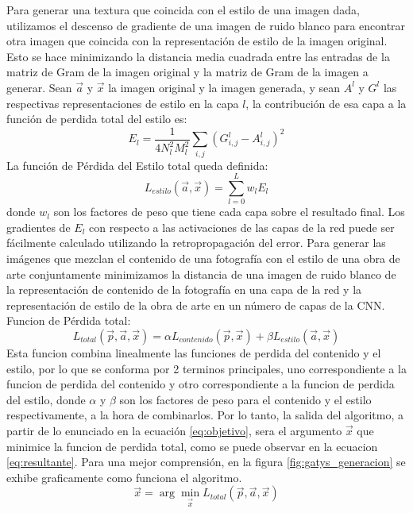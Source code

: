 \documentclass[a4paper,11pt,spanish]{book}
\begin{document}
      Para generar una textura que coincida con el estilo de una imagen dada, utilizamos el descenso de gradiente de una imagen de ruido blanco para encontrar otra imagen que coincida
      con la representación de estilo de la imagen original. Esto se hace minimizando la distancia media cuadrada entre las entradas de la matriz de Gram de la imagen
      original y la matriz de Gram de la imagen a generar. Sean $\overrightarrow{a}$ y $\overrightarrow{x}$ la imagen original y la imagen generada, y sean $A^l$ y $G^l$
      las respectivas representaciones de estilo en la capa $l$, la contribución de esa capa a la función de perdida total del estilo es:
      \begin{equation}
       E_l = \frac{1}{4 N_l^2 M_l^2} \sum_{i,j} (G_{i,j}^l - A_{i,j}^l)^2
      \end{equation}
      La función de Pérdida del Estilo total queda definida:
      \begin{equation}
       L_{estilo}(\overrightarrow{a},\overrightarrow{x}) = \sum_{l=0}^{L} w_l E_l
      \end{equation}
      donde $w_l$ son los factores de peso que tiene cada capa sobre el resultado final. Los gradientes de $E_l$ con respecto a las activaciones de las capas de la red puede ser fácilmente
      calculado utilizando la retropropagación del error.
      Para generar las imágenes que mezclan el contenido de una fotografía con el estilo de una obra de arte conjuntamente minimizamos la distancia de una imagen de ruido blanco
      de la representación de contenido de la fotografía en una capa de la red y la representación de estilo de la obra de arte en un número de capas de la CNN.
      Funcion de Pérdida total:
      \begin{equation}\label{eq:objetivo}
       L_{total}(\overrightarrow{p},\overrightarrow{a},\overrightarrow{x}) = \alpha L_{contenido}(\overrightarrow{p},\overrightarrow{x}) + \beta L_{estilo}(\overrightarrow{a},\overrightarrow{x})
      \end{equation}
      Esta funcion combina linealmente las funciones de perdida del contenido y el estilo, por lo que se conforma por 2 terminos principales, uno correspondiente a la funcion de perdida
      del contenido y otro correspondiente a la funcion de perdida del estilo, donde $\alpha$ y $\beta$ son los factores de peso para el contenido y el estilo respectivamente, 
      a la hora de combinarlos. Por lo tanto, la salida del algoritmo, a partir de lo enunciado en la ecuación \eqref{eq:objetivo}, sera el argumento $\overrightarrow{x}$
      que minimice la funcion de perdida total, como se puede observar en la ecuacion \eqref{eq:resultante}. Para una mejor comprensión, en la figura \ref{fig:gatys_generacion} 
      se exhibe graficamente como funciona el algoritmo.
      \begin{equation} \label{eq:resultante}
       \overrightarrow{x} = \arg\min_{\overrightarrow{x}} L_{total}(\overrightarrow{p},\overrightarrow{a},\overrightarrow{x})
      \end{equation}
\end{document}
